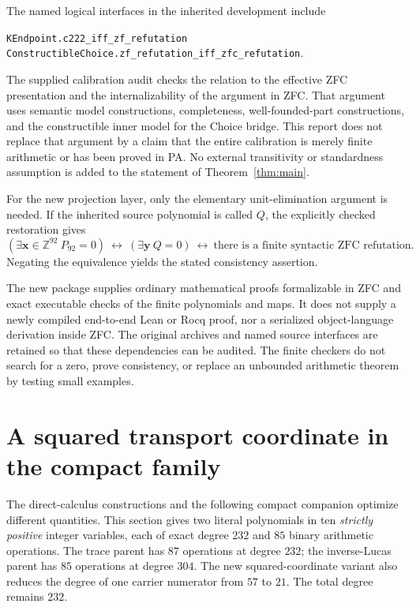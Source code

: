 \documentclass[11pt]{article}
\newcommand{\Z}{\mathbb Z}
\begin{document}
The named logical interfaces in the inherited development include
\begin{center}\small
\texttt{KEndpoint.c222\_iff\_zf\_refutation}\\
\texttt{ConstructibleChoice.zf\_refutation\_iff\_zfc\_refutation}.
\end{center}
The supplied calibration audit checks the relation to the effective
ZFC presentation and the internalizability of the argument in ZFC.
That argument uses semantic model constructions, completeness,
well-founded-part constructions, and the constructible inner model
for the Choice bridge. This report does not replace that argument by
a claim that the entire calibration is merely finite arithmetic or
has been proved in PA. No external transitivity or standardness
assumption is added to the statement of Theorem~\ref{thm:main}.

For the new projection layer, only the elementary unit-elimination
argument is needed. If the inherited source polynomial is called $Q$,
the explicitly checked restoration gives
\[
 (\exists\boldsymbol x\in\Z^{92}\ P_{92}=0)
 \ \longleftrightarrow\
 (\exists\boldsymbol y\ Q=0)
 \ \longleftrightarrow\
 \text{there is a finite syntactic ZFC refutation}.
\]
Negating the equivalence yields the stated consistency assertion.

The new package supplies ordinary mathematical proofs formalizable
in ZFC and exact executable checks of the finite polynomials and maps.
It does not supply a newly compiled end-to-end Lean or Rocq proof,
nor a serialized object-language derivation inside ZFC. The original
archives and named source interfaces are retained so that these
dependencies can be audited. The finite checkers do not search for a
zero, prove consistency, or replace an unbounded arithmetic theorem
by testing small examples.

\section{A squared transport coordinate in the compact family}

\label{sec:compact-companion}

The direct-calculus constructions and the following compact companion
optimize different quantities.  This section gives two literal polynomials
in ten \emph{strictly positive} integer variables, each of exact degree
$232$ and $85$ binary arithmetic operations.  The trace parent has
$87$ operations at degree $232$; the inverse-Lucas parent has $85$
operations at degree $304$.  The new squared-coordinate variant also
reduces the degree of one carrier numerator from $57$ to $21$.
The total degree remains $232$.
\end{document}
